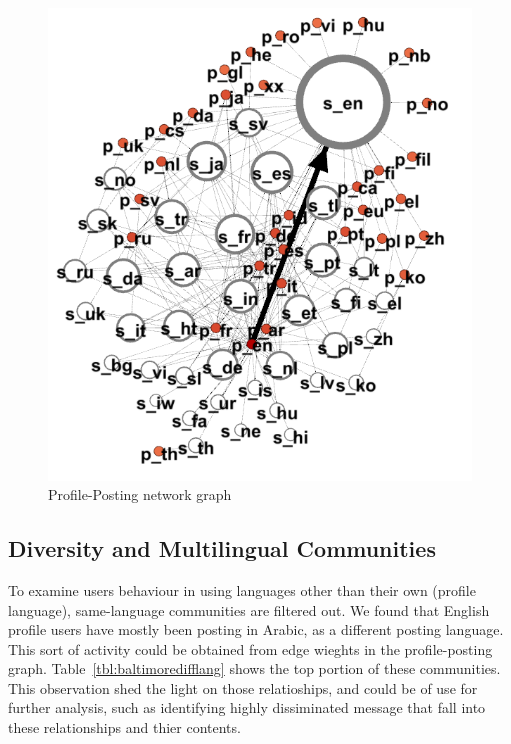 \begin{figure}[htb]
\centering
\includegraphics[width=\columnwidth]{images/baltimore_p_s_lang_sl.png}
\caption{Profile-Posting network graph}
\label{fig:baltimore_p_s_lang_sl}
\end{figure}


\subsection{Diversity and Multilingual Communities}

To examine users behaviour in using languages other than their 
own (profile language), same-language communities are filtered out.
We found that English profile users have mostly been posting in Arabic, as a 
different posting language. This sort of activity could be obtained from edge 
wieghts in the profile-posting graph. Table~\ref{tbl:baltimoredifflang} shows 
the top portion of these communities. This observation shed the light on those 
relatioships, and could be of use for further analysis, such as identifying highly dissiminated 
message that fall into these relationships and thier contents. 

